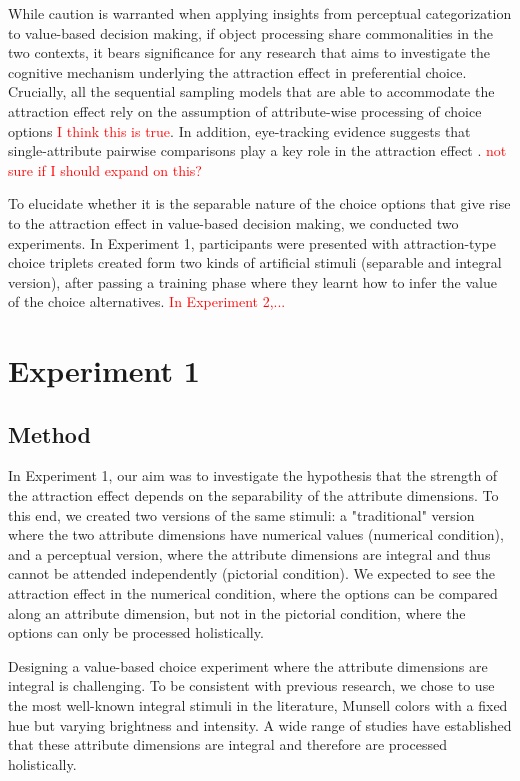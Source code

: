 \documentclass[11pt,a4paper]{article}
\begin{document}
While caution is warranted when applying insights from perceptual categorization to value-based decision making, if object processing share commonalities in the two contexts, it bears significance for any research that aims to investigate the cognitive mechanism underlying the attraction effect in preferential choice.   Crucially, all the sequential sampling models that are able to accommodate the attraction effect rely on the assumption of attribute-wise processing of choice options \textcolor{red}{I think this is true}. In addition, eye-tracking evidence suggests that single-attribute pairwise comparisons play a key role in the attraction effect \cite{Noguchi2014}. \textcolor{red}{not sure if I should expand on this?}

To elucidate whether it is the separable nature of the choice options that give rise to the attraction effect in value-based decision making, we conducted two experiments. In Experiment 1, participants were presented with attraction-type choice triplets created form two kinds of artificial stimuli (separable and integral version), after passing a training phase where they learnt how to infer the value of the choice alternatives. \textcolor{red}{In Experiment 2,...}

\section{Experiment 1} 


\subsection{Method}

In Experiment 1, our aim was to investigate the hypothesis that the strength of the attraction effect depends on the separability of the attribute dimensions. To this end, we created two versions of the same stimuli: a "traditional" version where the two attribute dimensions have numerical values (numerical condition), and a perceptual version, where the attribute dimensions are integral and thus cannot be attended independently (pictorial condition). We expected to see the attraction effect in the numerical condition, where the options can be compared along an attribute dimension, but not in the pictorial condition, where the options can only be processed holistically.

Designing a value-based choice experiment where the attribute dimensions are integral is challenging. To be consistent with previous research, we chose to use the most well-known integral stimuli in the literature, Munsell colors with a fixed hue but varying brightness and intensity. A wide range of studies have established that these attribute dimensions are integral and therefore are processed holistically. 
\end{document}
